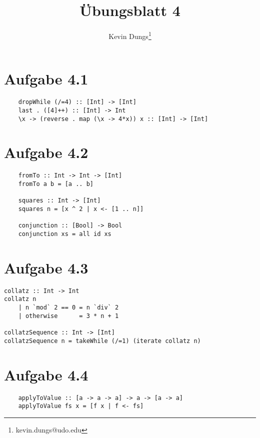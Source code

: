 \documentclass[a4paper]{scrartcl}
\title{Übungsblatt 4}
\author{Kevin Dungs\thanks{kevin.dungs@udo.edu}}
\begin{document}
\maketitle

\section*{Aufgabe 4.1}
\begin{verbatim}
    dropWhile (/=4) :: [Int] -> [Int]
    last . ([4]++) :: [Int] -> Int
    \x -> (reverse . map (\x -> 4*x)) x :: [Int] -> [Int]
\end{verbatim}

\section*{Aufgabe 4.2}
\begin{verbatim}
    fromTo :: Int -> Int -> [Int]
    fromTo a b = [a .. b]

    squares :: Int -> [Int]
    squares n = [x ^ 2 | x <- [1 .. n]]

    conjunction :: [Bool] -> Bool
    conjunction xs = all id xs
\end{verbatim}

\section*{Aufgabe 4.3}
\begin{verbatim}
collatz :: Int -> Int
collatz n
    | n `mod` 2 == 0 = n `div` 2
    | otherwise      = 3 * n + 1

collatzSequence :: Int -> [Int]
collatzSequence n = takeWhile (/=1) (iterate collatz n)
\end{verbatim}

\section*{Aufgabe 4.4}
\begin{verbatim}
    applyToValue :: [a -> a -> a] -> a -> [a -> a]
    applyToValue fs x = [f x | f <- fs]
\end{verbatim}
\end{document}
